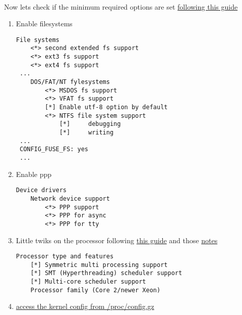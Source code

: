 \documentclass[11pt,a4paper]{article}
\begin{document}
                \newpage
                \paragraph{} Now lets check if the minimum required options are set \href{https://wiki.gentoo.org/wiki/Handbook:AMD64/Installation/Kernel#Activating_required_options}{following this guide}

                \begin{enumerate}

                    \item Enable filesystems
                        \begin{lstlisting}[style=KernelConfig]
 File systems
    <*> second extended fs support
    <*> ext3 fs support
    <*> ext4 fs support
 ...
    DOS/FAT/NT fylesystems
        <*> MSDOS fs support
        <*> VFAT fs support
        [*] Enable utf-8 option by default
        <*> NTFS file system support
            [*]     debugging
            [*]     writing
 ...
 CONFIG_FUSE_FS: yes
 ...
                        \end{lstlisting}

                    \newpage
                    \item Enable ppp

                        \begin{lstlisting}[style=KernelConfig]
 Device drivers
    Network device support
        <*> PPP support
        <*> PPP for async
        <*> PPP for tty
                         \end{lstlisting}


                     \newpage
                     \item Little twiks on the processor following \href{https://wiki.gentoo.org/wiki/Kernel/Gentoo_Kernel_Configuration_Guide#Multiprocessor.2C_Hyper-Threading_and_multi-core_systems}{this guide} and those \href{https://forums.gentoo.org/viewtopic-t-939150-start-0.html}{notes}

                        \begin{lstlisting}[style=KernelConfig]
 Processor type and features
    [*] Symmetric multi processing support
    [*] SMT (Hyperthreading) scheduler support
    [*] Multi-core scheduler support
    Processor family (Core 2/newer Xeon)
                        \end{lstlisting}

                    \newpage
                    \item \href{https://wiki.gentoo.org/wiki/Kernel/IKCONFIG_Support}{access the kernel config from /proc/config.gz}


\end{enumerate}
\end{document}

